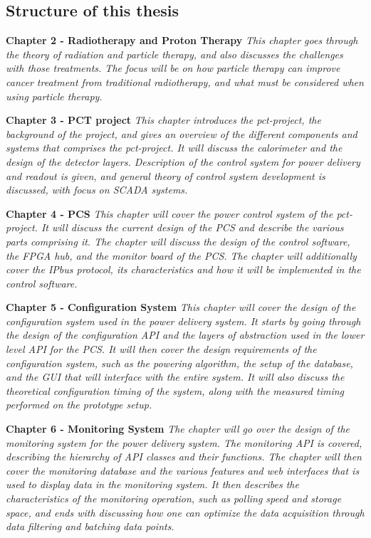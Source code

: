 \documentclass[main.tex]{subfiles}
\begin{document}
\subsection{Structure of this thesis}

\textbf{Chapter 2 - Radiotherapy and Proton Therapy} \textit{This chapter goes through the theory of radiation and particle therapy, and also discusses the challenges with those treatments. The focus will be on how particle therapy can improve cancer treatment from traditional radiotherapy, and what must be considered when using particle therapy.} 

\textbf{Chapter 3 - PCT project} \textit{This chapter introduces the \gls{pct}-project, the background of the project, and gives an overview of the different components and systems that comprises the \gls{pct}-project. It will discuss the calorimeter and the design of the detector layers. Description of the control system for power delivery and readout is given, and general theory of control system development is discussed, with focus on SCADA systems.}

\textbf{Chapter 4 - PCS} \textit{This chapter will cover the power control system of the \gls{pct}-project. It will discuss the current design of the PCS and describe the various parts comprising it. The chapter will discuss the design of the control software, the FPGA hub, and the monitor board  of the PCS. The chapter will additionally cover the IPbus protocol, its characteristics and how it will be implemented in the control software.}

\textbf{Chapter 5 - Configuration System} \textit{This chapter will cover the design of the configuration system used in the power delivery system. It starts by going through the design of the configuration API and the layers of abstraction used in the lower level API for the PCS. It will then cover the design requirements of the configuration system, such as the powering algorithm, the setup of the database, and the GUI that will interface with the entire system. It will also discuss the theoretical configuration timing of the system, along with the measured timing performed on the prototype setup.}

\textbf{Chapter 6 - Monitoring System} \textit{The chapter will go over the design of the monitoring system for the power delivery system. The monitoring API is covered, describing the hierarchy of API classes and their functions. The chapter will then cover the monitoring database and the various features and web interfaces that is used to display data in the monitoring system. It then describes the characteristics of the monitoring operation, such as polling speed and storage space, and ends with discussing how one can optimize the data acquisition through data filtering and batching data points.}
\end{document}
